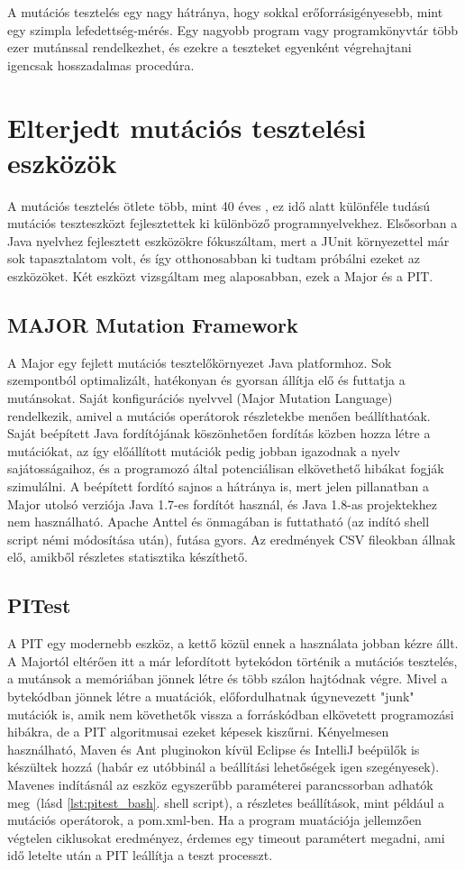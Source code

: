A mutációs tesztelés egy nagy hátránya, hogy sokkal erőforrásigényesebb, mint egy szimpla lefedettség-mérés. Egy nagyobb program vagy programkönyvtár több ezer mutánssal rendelkezhet, és ezekre a teszteket egyenként végrehajtani igencsak hosszadalmas procedúra. 
\section{Elterjedt mutációs tesztelési eszközök}
A mutációs tesztelés ötlete több, mint 40 éves \cite{major_2011}, ez idő alatt különféle tudású mutációs teszteszközt fejlesztettek ki különböző programnyelvekhez. Elsősorban a Java nyelvhez fejlesztett eszközökre fókuszáltam, mert a JUnit környezettel már sok tapasztalatom volt, és így otthonosabban ki tudtam próbálni ezeket az eszközöket. Két eszközt vizsgáltam meg alaposabban, ezek a Major és a PIT.
\subsection{MAJOR Mutation Framework}
A Major egy fejlett mutációs tesztelőkörnyezet Java platformhoz. Sok szempontból optimalizált, hatékonyan és gyorsan állítja elő és futtatja a mutánsokat. Saját konfigurációs nyelvvel (Major Mutation Language) rendelkezik, amivel a mutációs operátorok részletekbe menően beállíthatóak. Saját beépített Java fordítójának köszönhetően fordítás közben hozza létre a mutációkat, az így előállított mutációk pedig jobban igazodnak a nyelv sajátosságaihoz, és a programozó által potenciálisan elkövethető hibákat fogják szimulálni. A beépített fordító sajnos a hátránya is, mert jelen pillanatban a Major utolsó verziója Java 1.7-es fordítót használ, és Java 1.8-as projektekhez nem használható. Apache Anttel és önmagában is futtatható (az indító shell script némi módosítása után), futása gyors. Az eredmények CSV fileokban állnak elő, amikből részletes statisztika készíthető. \cite{major_manual}
\subsection{PITest}
A PIT egy modernebb eszköz, a kettő közül ennek a használata jobban kézre állt. A Majortól eltérően itt a már lefordított bytekódon történik a mutációs tesztelés, a mutánsok a memóriában jönnek létre és több szálon hajtódnak végre. Mivel a bytekódban jönnek létre a muatációk, előfordulhatnak úgynevezett "junk" mutációk is, amik nem követhetők vissza a forráskódban elkövetett programozási hibákra, de a PIT algoritmusai ezeket képesek kiszűrni. Kényelmesen használható, Maven és Ant pluginokon kívül Eclipse és IntelliJ beépülők is készültek hozzá (habár ez utóbbinál a beállítási lehetőségek igen szegényesek). Mavenes indításnál az eszköz egyszerűbb paraméterei parancssorban adhatók meg~(lásd \ref{lst:pitest_bash}. shell script), a részletes beállítások, mint például a mutációs operátorok, a pom.xml-ben. Ha a program muatációja jellemzően végtelen ciklusokat eredményez, érdemes egy timeout paramétert megadni, ami idő letelte után a PIT leállítja a teszt processzt. \cite{pit_quickstart}

